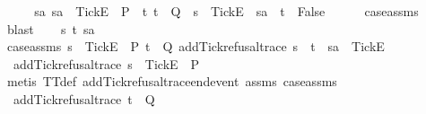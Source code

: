 \begin{isabellebody}
{\ \ \isamarkupfalse%
\ \isamarkupfalse%
\ {\isachardoublequoteopen}{\isasymforall}sa{\isachardot}\ sa\ {\isacharat}\ {\isacharbrackleft}{\isacharbrackleft}Tick{\isacharbrackright}\isactrlsub E{\isacharbrackright}\ {\isasymin}\ P\ {\isasymlongrightarrow}\ {\isacharparenleft}{\isasymforall}t{\isachardot}\ t\ {\isasymin}\ Q\ {\isasymlongrightarrow}\ s\ {\isacharat}\ {\isacharbrackleft}{\isacharbrackleft}Tick{\isacharbrackright}\isactrlsub E{\isacharbrackright}\ {\isasymnoteq}\ sa\ {\isacharat}\ t{\isacharparenright}\ {\isasymLongrightarrow}\ False{\isachardoublequoteclose}\isanewline
\ \ \ \ \isamarkupfalse%
\ case{\isacharunderscore}assms{\isacharparenleft}{}{\isacharparenright}\ \isamarkupfalse%
\ blast\isanewline
{}\isamarkupfalse%
\isanewline
\ \ \isamarkupfalse%
\ s\ t\ sa\isanewline
\ \ \isamarkupfalse%
\ case{\isacharunderscore}assms{\isacharcolon}\ {\isachardoublequoteopen}s\ {\isacharat}\ {\isacharbrackleft}{\isacharbrackleft}Tick{\isacharbrackright}\isactrlsub E{\isacharbrackright}\ {\isasymin}\ P{\isachardoublequoteclose}\ {\isachardoublequoteopen}t\ {\isasymin}\ Q{\isachardoublequoteclose}\ {\isachardoublequoteopen}add{\isacharunderscore}Tick{\isacharunderscore}refusal{\isacharunderscore}trace\ {\isacharparenleft}s\ {\isacharat}\ t{\isacharparenright}\ {\isacharequal}\ sa\ {\isacharat}\ {\isacharbrackleft}{\isacharbrackleft}Tick{\isacharbrackright}\isactrlsub E{\isacharbrackright}{\isachardoublequoteclose}\isanewline
\ \ \isamarkupfalse%
\ {}{\isacharcolon}\ {\isachardoublequoteopen}add{\isacharunderscore}Tick{\isacharunderscore}refusal{\isacharunderscore}trace\ s\ {\isacharat}\ {\isacharbrackleft}{\isacharbrackleft}Tick{\isacharbrackright}\isactrlsub E{\isacharbrackright}\ {\isasymin}\ P{\isachardoublequoteclose}\isanewline
\ \ \ \ \isamarkupfalse%
\ {\isacharparenleft}metis\ TT{}{\isacharunderscore}def\ add{\isacharunderscore}Tick{\isacharunderscore}refusal{\isacharunderscore}trace{\isacharunderscore}end{\isacharunderscore}event\ assms{\isacharparenleft}{}{\isacharparenright}\ case{\isacharunderscore}assms{\isacharparenleft}{}{\isacharparenright}{\isacharparenright}\isanewline
\ \ \isamarkupfalse%
\ {}{\isacharcolon}\ {\isachardoublequoteopen}add{\isacharunderscore}Tick{\isacharunderscore}refusal{\isacharunderscore}trace\ t\ {\isasymin}\ Q{\isachardoublequoteclose}\isanewline
\ \ \ \ \isamarkupfalse%
}
\end{isabellebody}
